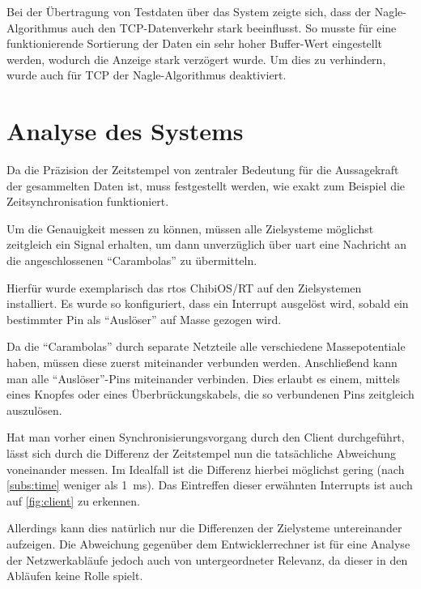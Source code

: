 Bei der Übertragung von Testdaten über das System zeigte sich, dass der
Nagle-Algorithmus\cite{RFC896} auch den TCP-Datenverkehr stark beeinflusst.
So musste für eine funktionierende Sortierung der Daten ein sehr hoher
Buffer-Wert eingestellt werden, wodurch die Anzeige stark verzögert wurde. Um
dies zu verhindern, wurde auch für TCP der Nagle-Algorithmus deaktiviert.
\section{Analyse des Systems}\label{sect:analyse}
Da die Präzision der Zeitstempel von zentraler Bedeutung für die
Aussagekraft der gesammelten Daten ist, muss festgestellt werden, wie exakt zum
Beispiel die Zeitsynchronisation funktioniert.

Um die Genauigkeit messen zu können, müssen alle Zielsysteme möglichst
zeitgleich ein Signal erhalten, um dann unverzüglich über \gls{uart} eine
Nachricht an die angeschlossenen "`Carambolas"' zu übermitteln.

Hierfür wurde exemplarisch das \gls{rtos} ChibiOS/RT\cite{CHIB} auf den
Zielsystemen installiert. Es wurde so konfiguriert, dass ein Interrupt ausgelöst
wird, sobald ein bestimmter Pin als "`Auslöser"' auf Masse gezogen wird.

Da die "`Carambolas"' durch separate Netzteile alle verschiedene Massepotentiale
haben, müssen diese zuerst miteinander verbunden werden. Anschließend kann man
alle "`Auslöser"'-Pins miteinander verbinden. Dies erlaubt es einem, mittels
eines Knopfes oder eines Überbrückungskabels, die so verbundenen Pins zeitgleich
auszulösen.

Hat man vorher einen Synchronisierungsvorgang durch den Client durchgeführt,
lässt sich durch die Differenz der Zeitstempel nun die tatsächliche Abweichung
voneinander messen. Im Idealfall ist die Differenz hierbei möglichst gering
(nach \autoref{subs:time} weniger als \SI{1}{\milli\second}). Das Eintreffen
dieser erwähnten Interrupts ist auch auf \autoref{fig:client} zu erkennen.

Allerdings kann dies natürlich nur die Differenzen der Zielysteme untereinander
aufzeigen. Die Abweichung gegenüber dem Entwicklerrechner ist für eine Analyse
der Netzwerkabläufe jedoch auch von untergeordneter Relevanz, da dieser in den
Abläufen keine Rolle spielt.

